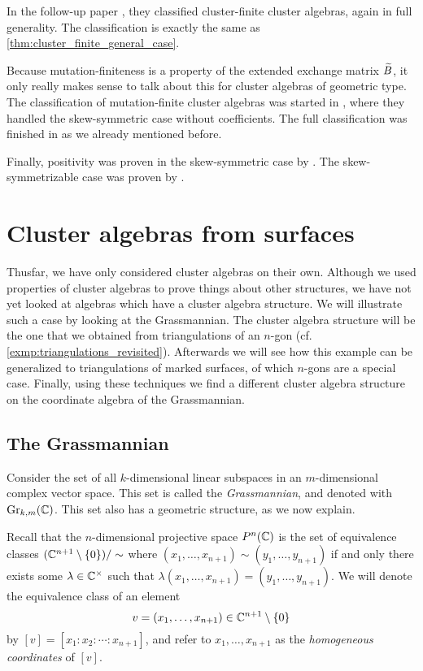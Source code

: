 In the follow-up paper \cite{FominZelevinsky2003CAFin}, they classified cluster-finite
cluster algebras, again in full generality. The classification is exactly the same as
\cref{thm:cluster_finite_general_case}.

Because mutation-finiteness is a property of the extended exchange matrix $\widetilde{B}$, it
only really makes sense to talk about this for cluster algebras of geometric type. The
classification of mutation-finite cluster algebras was started in
\cite{FeliksonShapiroTumarkin2012SkewSCA}, where they handled the skew-symmetric case
without coefficients. The full classification was finished in
\cite{FeliksonPavel2023cluster} as we already mentioned before.

Finally, positivity was proven in the skew-symmetric case by
\textcite{LeeSchiffler2015PositivityCA}. The skew-symmetrizable case was proven by
\textcite{GrossHackingKeelKontsevich2018CanonicalBCA}.

\section{Cluster algebras from surfaces}\label{sec:cluster_algebras_surfaces}

Thusfar, we have only considered cluster algebras on their own. Although we used
properties of cluster algebras to prove things about other structures, we have not yet
looked at algebras which have a cluster algebra structure. We will illustrate such a
case by looking at the Grassmannian. The cluster algebra structure will be the one that
we obtained from triangulations of an $n$-gon (cf.
\cref{exmp:triangulations_revisited}). Afterwards we will see how this example can be
generalized to triangulations of marked surfaces, of which $n$-gons are a special case.
Finally, using these techniques we find a different cluster algebra structure on the
coordinate algebra of the Grassmannian.

\subsection{The Grassmannian}

Consider the set of all $k$-dimensional linear subspaces in an $m$-dimensional complex
vector space. This set is called the \emph{Grassmannian}, and
denoted with $\operatorname{Gr}_{k,m}(\mathbb{C})$. This set also has a
geometric structure, as we now explain.

Recall that the $n$-dimensional projective space $P^n(\mathbb{C})$ is the set of equivalence
classes $(\mathbb{C}^{n+1} \setminus \{0\}) / \sim$ where $ (x_1, \dots, x_{n+1}) \sim (y_1,
	\dots, y_{n+1})$ if and only there exists some $\lambda \in \mathbb{C}^\times$ such that
$\lambda(x_1, \dots, x_{n+1}) = (y_1, \dots, y_{n+1})$. We will denote the equivalence
class of an element
\begin{equation*}
	v = (x_1, \dots, x_{n+1}) \in \mathbb{C}^{n+1} \setminus \{0\}
\end{equation*}
%
by $[v] = [x_1 \colon x_2 \colon \dotsb \colon x_{n+1}]$, and refer to $x_1, \dots,
	x_{n+1}$ as the \emph{homogeneous coordinates} of $[v]$.

